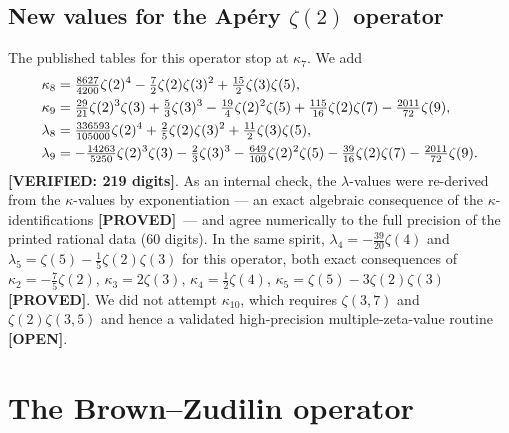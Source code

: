 \documentclass[11pt,reqno]{amsart}
\theoremstyle{plain}
\theoremstyle{definition}
\theoremstyle{remark}
\newcommand{\PROVED}{{\normalfont\sffamily\bfseries[PROVED]}}
\newcommand{\VER}[1]{{\normalfont\sffamily\bfseries[VERIFIED: #1]}}
\newcommand{\OPEN}{{\normalfont\sffamily\bfseries[OPEN]}}
\begin{document}
\subsection{New values for the Ap\'ery \texorpdfstring{$\zeta(2)$}{zeta(2)} operator}
The published tables for this operator stop at $\kappa_7$. We add
\begin{align}
  \kappa_8 &= \tfrac{8627}{4200}\zeta(2)^4-\tfrac{7}{2}\zeta(2)\zeta(3)^2
              +\tfrac{15}{2}\zeta(3)\zeta(5),\notag\\
  \kappa_9 &= \tfrac{29}{21}\zeta(2)^3\zeta(3)+\tfrac{5}{3}\zeta(3)^3
              -\tfrac{19}{4}\zeta(2)^2\zeta(5)+\tfrac{115}{16}\zeta(2)\zeta(7)
              -\tfrac{2011}{72}\zeta(9),\label{eq:apery2new}\\
  \lambda_8 &= \tfrac{336593}{105000}\zeta(2)^4+\tfrac{2}{5}\zeta(2)\zeta(3)^2
              +\tfrac{11}{2}\zeta(3)\zeta(5),\notag\\
  \lambda_9 &= -\tfrac{14263}{5250}\zeta(2)^3\zeta(3)-\tfrac{2}{3}\zeta(3)^3
              -\tfrac{649}{100}\zeta(2)^2\zeta(5)-\tfrac{39}{16}\zeta(2)\zeta(7)
              -\tfrac{2011}{72}\zeta(9).\notag
\end{align}
\VER{219 digits}. As an internal check, the $\lambda$-values were re-derived from the
$\kappa$-values by exponentiation --- an exact algebraic consequence of the
$\kappa$-identifications \PROVED\ --- and agree numerically to the full precision of the printed
rational data ($60$ digits). In the same
spirit, $\lambda_4=-\tfrac{39}{20}\zeta(4)$ and
$\lambda_5=\zeta(5)-\tfrac{1}{5}\zeta(2)\zeta(3)$ for this operator, both exact consequences of
$\kappa_2=-\tfrac75\zeta(2)$, $\kappa_3=2\zeta(3)$, $\kappa_4=\tfrac12\zeta(4)$,
$\kappa_5=\zeta(5)-3\zeta(2)\zeta(3)$ \PROVED. We did not attempt $\kappa_{10}$, which requires
$\zeta(3,7)$ and $\zeta(2)\zeta(3,5)$ and hence a validated high-precision multiple-zeta-value
routine \OPEN.

\section{The Brown--Zudilin operator}\label{sec:BZop}
\end{document}
